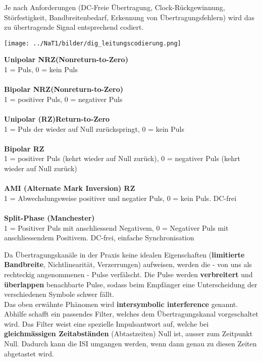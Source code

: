 Je nach Anforderungen (DC-Freie Übertragung, Clock-Rückgewinnung, Störfestigkeit,
Bandbreitenbedarf, Erkennung von Übertragungsfehlern) wird das zu übertragende Signal entsprechend
codiert.

\begin{minipage}{9cm}
	\texttt{[image: ../NaT1/bilder/dig\_leitungscodierung.png]}
\end{minipage}
\begin{minipage}{9cm}
	\textbf{Unipolar NRZ(Nonreturn-to-Zero)} \\
	1 = Puls, 0 = kein Puls \\ \\
	\textbf{Bipolar NRZ(Nonreturn-to-Zero)} \\
	1 = positiver Puls, 0 = negativer Puls \\ \\
	\textbf{Unipolar (RZ)Return-to-Zero} \\
	1 = Puls der wieder auf Null zurückspringt, 0 = kein Puls \\ \\
	\textbf{Bipolar RZ} \\
	1 = positiver Puls (kehrt wieder auf Null zurück), 0 = negativer Puls (kehrt wieder auf Null
	zurück)\\ \\
	\textbf{AMI (Alternate Mark Inversion) RZ} \\
	1 = Abwechslungsweise positiver und negatier Puls, 0 = kein Puls. DC-frei\\ \\
	\textbf{Split-Phase (Manchester)} \\
	1 = Positiver Puls mit anschliessend Negativem, 0 = Negativer Puls mit anschliessendem Positivem. DC-frei, einfache Synchronisation
\end{minipage}


Da Übertragungskanäle in der Praxis keine idealen Eigenschaften 
(\textbf{limitierte Bandbreite}, Nichtlinearität, Verzerrungen) aufweisen,
werden die - von uns als rechteckig
angenommenen - Pulse verfälscht. Die Pulse werden \textbf{verbreitert} und \textbf{überlappen}
benachbarte Pulse, sodass beim Empfänger eine Unterscheidung der verschiedenen Symbole schwer
fällt. \\
Das oben erwähnte Phänomen wird \textbf{intersymbolic interference} genannt. \\
Abhilfe schafft ein passendes Filter, welches dem Übertragungskanal vorgeschaltet wird. Das Filter
weist eine spezielle Impulsantwort auf, welche bei \textbf{gleichmässigen Zeitabständen}
(Abtastzeiten) Null ist, ausser zum Zeitpunkt Null. Dadurch kann die ISI umgangen werden, wenn dann
genau zu diesen Zeiten abgetastet wird. \\ 

